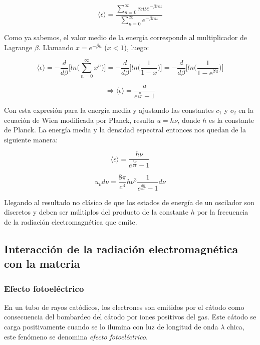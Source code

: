 \documentclass[a4paper]{article}
\begin{document}
$$\langle \epsilon \rangle = \frac{\sum_{n = 0}^{\infty} nu e^{-\beta nu}}{\sum_{n = 0}^{\infty} e^{-\beta nu}}$$

Como ya sabemos, el valor medio de la energ\'ia corresponde al multiplicador de Lagrange $\beta$. Llamando $x = e^{-\beta u}$ ($x < 1$), luego:

$$\langle \epsilon \rangle = -\frac{d}{d\beta}\bigg[ln\bigg(\sum_{n = 0}^{\infty} x^{n} \bigg) \bigg] = -\frac{d}{d\beta}\bigg[ln\bigg(\frac{1}{1-x} \bigg) \bigg] = -\frac{d}{d\beta}\bigg[ln\bigg(\frac{1}{1-e^{\beta u}} \bigg) \bigg]$$

$$\Rightarrow \langle \epsilon \rangle = \frac{u}{e^{\frac{u}{kT}} - 1}$$

Con esta expresi\'on para la energ\'ia media y ajustando las constantes $c_{1}$ y $c_{2}$ en la ecuaci\'on de Wien modificada por Planck, resulta $u = h \nu$, donde $h$ es la constante de Planck. La energ\'ia media y la densidad espectral entonces nos quedan de la siguiente manera:

\begin{equation}
\label{emediaplanck}
\langle \epsilon \rangle = \frac{h\nu}{e^{\frac{h \nu}{kT}} - 1}
\end{equation}

\begin{equation}
\label{densidadplanck}
u_{\nu}d\nu = \frac{8\pi}{c^{3}}h\nu^{3}\frac{1}{e^{\frac{h \nu}{kT}} - 1}d\nu
\end{equation}

Llegando al resultado no cl\'asico de que los estados de energ\'ia de un oscilador son discretos y deben ser m\'ultiplos del producto de la constante $h$ por la frecuencia de la radiaci\'on electromagn\'etica que emite.

\subsection{Interacci\'on de la radiaci\'on electromagn\'etica con la materia}

\subsubsection{Efecto fotoel\'ectrico}

En un tubo de rayos cat\'odicos, los electrones son emitidos por el c\'atodo como consecuencia del bombardeo del c\'atodo por iones positivos del gas. Este c\'atodo se carga positivamente cuando se lo ilumina con luz de longitud de onda $\lambda$ chica, este fen\'omeno se denomina \textit{efecto fotoel\'ectrico}.\\
\end{document}
